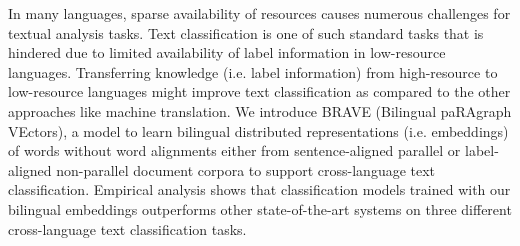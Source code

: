 In many languages, sparse availability of resources causes numerous challenges for textual analysis tasks. Text classification is one of such standard tasks that is hindered due to limited availability of label information in low-resource languages. Transferring knowledge (i.e. label information) from high-resource to low-resource languages might improve text classification as compared to the other approaches like machine translation. We introduce BRAVE (Bilingual paRAgraph VEctors), a model to learn bilingual distributed representations (i.e. embeddings) of words without word alignments either from sentence-aligned parallel or label-aligned non-parallel document corpora to support cross-language text classification. Empirical analysis shows that classification models trained with our bilingual embeddings outperforms other state-of-the-art systems on three different cross-language text classification tasks.
